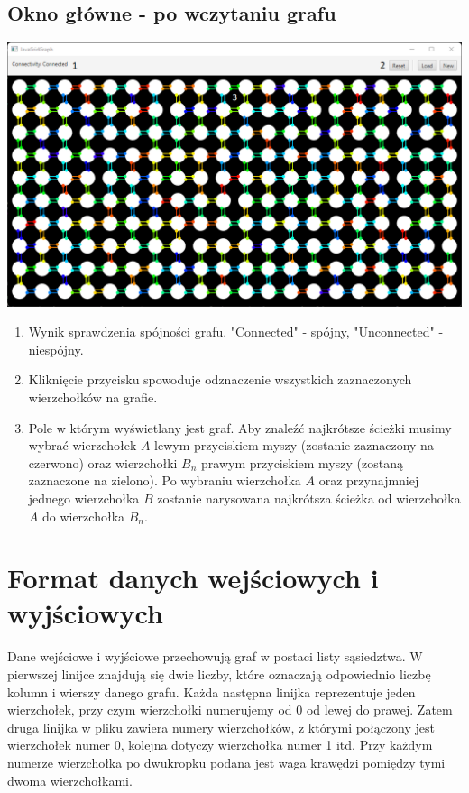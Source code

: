 \documentclass[11pt,a4paper]{report}
\begin{document}
    \subsection{Okno główne - po wczytaniu grafu}

    \includegraphics[width=\textwidth]{view3.png}

    \begin{enumerate}
        \item Wynik sprawdzenia spójności grafu. "Connected" - spójny, "Unconnected" - niespójny.
        \item Kliknięcie przycisku spowoduje odznaczenie wszystkich zaznaczonych wierzchołków na grafie.
        \item Pole w którym wyświetlany jest graf. Aby znaleźć najkrótsze ścieżki musimy wybrać wierzchołek $A$ lewym przyciskiem myszy (zostanie zaznaczony na czerwono) oraz wierzchołki $B_n$ prawym przyciskiem myszy (zostaną zaznaczone na zielono). Po wybraniu wierzchołka $A$ oraz przynajmniej jednego wierzchołka $B$ zostanie narysowana najkrótsza ścieżka od wierzchołka $A$ do wierzchołka $B_n$.
    \end{enumerate}




    \newpage
    \section{Format danych wejściowych i wyjściowych}
    Dane wejściowe i wyjściowe przechowują graf w postaci listy sąsiedztwa. W pierwszej linijce znajdują się dwie liczby, które oznaczają odpowiednio liczbę kolumn i wierszy danego grafu. Każda następna linijka reprezentuje jeden wierzchołek, przy czym wierzchołki numerujemy od 0 od lewej do prawej. Zatem druga linijka w pliku zawiera numery wierzchołków, z którymi połączony jest wierzchołek numer 0, kolejna dotyczy wierzchołka numer 1 itd. Przy każdym numerze wierzchołka po dwukropku podana jest waga krawędzi pomiędzy tymi dwoma wierzchołkami.
\end{document}
